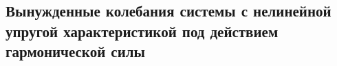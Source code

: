 

\subsection{Вынужденные колебания системы с нелинейной упругой характеристикой под действием гармонической силы}



